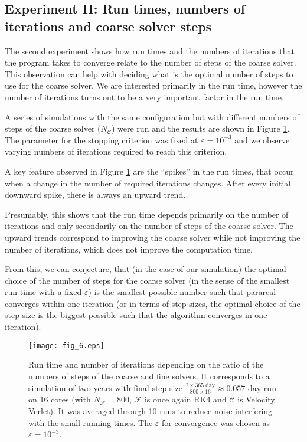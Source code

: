 \documentclass[conference]{IEEEtran}
\begin{document}
\subsection{Experiment II: Run times, numbers of iterations and coarse solver steps}

The second experiment shows how run times and the numbers of iterations that the program takes to converge relate to the number of steps of the coarse solver. This observation can help with deciding what is the optimal number of steps to use for the coarse solver. We are interested primarily in the run time, however the number of iterations turns out to be a very important factor in the run time.

A series of simulations with the same configuration but with different numbers of steps of the coarse solver ($N_\mathcal{C}$) were run and the results are shown in Figure \ref{timetest}. The parameter for the stopping criterion was fixed at $\varepsilon = 10^{-3}$ and we observe varying numbers of iterations required to reach this criterion.

A key feature observed in Figure \ref{timetest} are the ``spikes'' in the run times, that occur when a change in the number of required iterations changes. After every initial downward spike, there is always an upward trend. 

Presumably, this shows that the run time depends primarily on the number of iterations and only secondarily on the number of steps of the coarse solver. The upward trends correspond to improving the coarse solver while not improving the number of iterations, which does not improve the computation time.

From this, we can conjecture, that (in the case of our simulation) the optimal choice of the number of steps for the coarse solver (in the sense of the smallest run time with a fixed $\varepsilon$) is the smallest possible number such that parareal converges within one iteration (or in terms of step sizes, the optimal choice of the step size is the biggest possible such that the algorithm converges in one iteration).

\begin{figure}[htbp]
\centerline{\texttt{[image: fig\_6.eps]}}
\caption{Run time and number of iterations depending on the ratio of the numbers of steps of the coarse and fine solvers. It corresponds to a simulation of two years with final step size $\frac{2\times365\text{ day}}{800\times 16} \approx 0.057\text{ day}$ run on 16 cores (with $N_\mathcal{F} = 800$, $\mathcal{F}$ is once again RK4 and $\mathcal{C}$ is Velocity Verlet). It was averaged through 10 runs to reduce noise interfering with the small running times. The $\varepsilon$ for convergence was chosen as $\varepsilon = 10^{-3}$.}
\label{timetest}
\end{figure}
\end{document}
